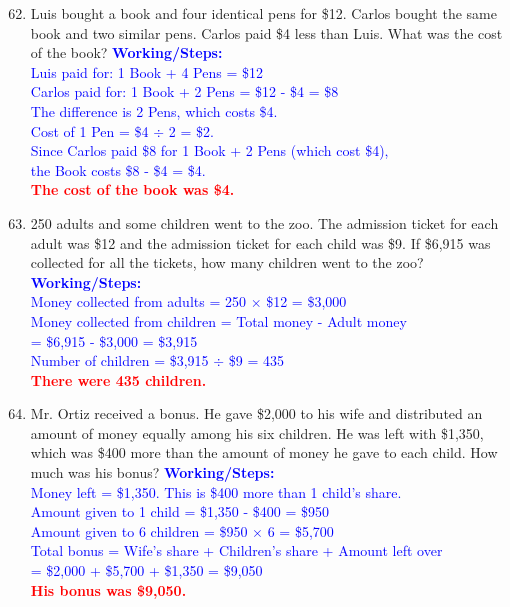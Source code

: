 \documentclass[11pt, a4paper]{article}
\newcommand{\answerline}[1]{\textcolor{red}{\textbf{#1}}}
\newcommand{\working}[1]{\vspace{10pt}\textcolor{blue}{\small \textbf{Working/Steps:}\\ #1}}
\begin{document}
\begin{enumerate}[label=\arabic*.]
    \setcounter{enumi}{61}
    \item Luis bought a book and four identical pens for \$12. Carlos bought the same book and two similar pens. Carlos paid \$4 less than Luis. What was the cost of the book?
    \working{Luis paid for: 1 Book + 4 Pens = \$12 \\ Carlos paid for: 1 Book + 2 Pens = \$12 - \$4 = \$8 \\ The difference is 2 Pens, which costs \$4. \\ Cost of 1 Pen = \$4 $\div$ 2 = \$2. \\ Since Carlos paid \$8 for 1 Book + 2 Pens (which cost \$4), \\ the Book costs \$8 - \$4 = \$4. \\ \answerline{The cost of the book was \$4.}}

    \vspace{4cm}

    \item 250 adults and some children went to the zoo. The admission ticket for each adult was \$12 and the admission ticket for each child was \$9. If \$6,915 was collected for all the tickets, how many children went to the zoo?
    \working{Money collected from adults = 250 $\times$ \$12 = \$3,000 \\ Money collected from children = Total money - Adult money \\ = \$6,915 - \$3,000 = \$3,915 \\ Number of children = \$3,915 $\div$ \$9 = 435 \\ \answerline{There were 435 children.}}

    \vspace{4cm}

    \item Mr. Ortiz received a bonus. He gave \$2,000 to his wife and distributed an amount of money equally among his six children. He was left with \$1,350, which was \$400 more than the amount of money he gave to each child. How much was his bonus?
    \working{Money left = \$1,350. This is \$400 more than 1 child's share. \\ Amount given to 1 child = \$1,350 - \$400 = \$950 \\ Amount given to 6 children = \$950 $\times$ 6 = \$5,700 \\ Total bonus = Wife's share + Children's share + Amount left over \\ = \$2,000 + \$5,700 + \$1,350 = \$9,050 \\ \answerline{His bonus was \$9,050.}}

\end{enumerate}
\end{document}
